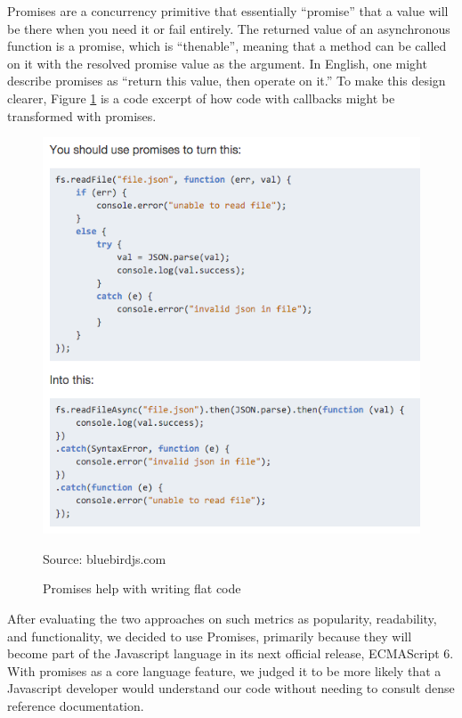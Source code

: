 \documentclass[pageno]{jpaper}
\newcommand{\source}[1]{\caption*{Source: {#1}} }
\begin{document}
Promises are a concurrency primitive that essentially ``promise'' that a value will be there when you need it or fail entirely. The returned value of an asynchronous function is a promise, which is ``thenable'', meaning that a method can be called on it with the resolved promise value as the argument. In English, one might describe promises as ``return this value, then operate on it.'' To make this design clearer, Figure \ref{fig:promises} is a code excerpt of how code with callbacks might be transformed with promises.

\begin{figure}[h]
\begin{center}
\includegraphics[scale=0.5] {promises}
\caption{Promises help with writing flat code}
 \label{fig:promises}
\source{bluebirdjs.com}
\end{center}
\end{figure}

After evaluating the two approaches on such metrics as popularity, readability, and functionality, we decided to use Promises, primarily because they will become part of the Javascript language in its next official release, ECMAScript 6. With promises as a core language feature, we judged it to be more likely that a Javascript developer would understand our code without needing to consult dense reference documentation.
\end{document}
